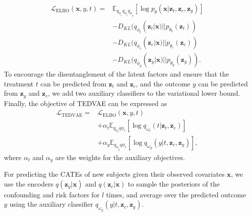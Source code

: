 \documentclass[letterpaper]{article} %
\begin{document}
\begin{align}
\mathcal{L}_{\textrm{ELBO}}(\mathbf{x},y,t) = & \mathbb{E}_{q_{\phi_c}{q_{\phi_t}}{q_{\phi_y}}} [\log p_\theta (\mathbf{x}|\mathbf{z}_t, \mathbf{z}_c, \mathbf{z}_y)] \nonumber\\
& -  D_{KL} (q_{\phi_t}(\mathbf{z}_t|\mathbf{x})|| p_{\theta_t}(\mathbf{z}_t)) \nonumber\\
& -  D_{KL} (q_{\phi_c}(\mathbf{z}_c|\mathbf{x})|| p_{\theta_c}(\mathbf{z}_c)) \nonumber\\
& -  D_{KL} (q_{\phi_y}(\mathbf{z}_y|\mathbf{x})|| p_{\theta_y}(\mathbf{z}_y)).
\end{align}
To  encourage the disentanglement of the latent factors and ensure that the treatment $t$ can be predicted from $\mathbf{z}_t$ and $\mathbf{z}_c$, and the outcome $y$ can be predicted from $\mathbf{z}_y$ and $\mathbf{z}_c$,  we add two auxiliary classifiers to the variational lower bound. Finally, the objective of TEDVAE can be expressed as
\begin{align}
\mathcal{L}_{\text{TEDVAE}} = & \mathcal{L}_{\textrm{ELBO}}(\mathbf{x},y,t)\nonumber\\
& + \alpha_t \mathbb{E}_{q_{\phi_{t}} q\phi_{c}} [\log q_{\omega_t}(t|\mathbf{z}_t,\mathbf{z}_c)]\nonumber \\
&+  \alpha_y \mathbb{E}_{q_{\phi_{y}} q\phi_{c}} [\log q_{\omega_y}(y|t, \mathbf{z}_c, \mathbf{z}_y)],
\label{loss_function}
\end{align}
where $\alpha_t$ and $\alpha_y$ are the weights for the auxiliary objectives.

For predicting the CATEs of new subjects given their observed covariates $\mathbf{x}$, we use the encoders $q(\mathbf{z}_y|\mathbf{x})$ and $q(\mathbf{z}_c|\mathbf{x})$ to sample the posteriors of the confounding and risk factors for $l$ times, and average over the predicted outcome $y$ using the auxiliary classifier $q_{\omega_y}(y|t, \mathbf{z}_c, \mathbf{z}_y)$.
\end{document}
